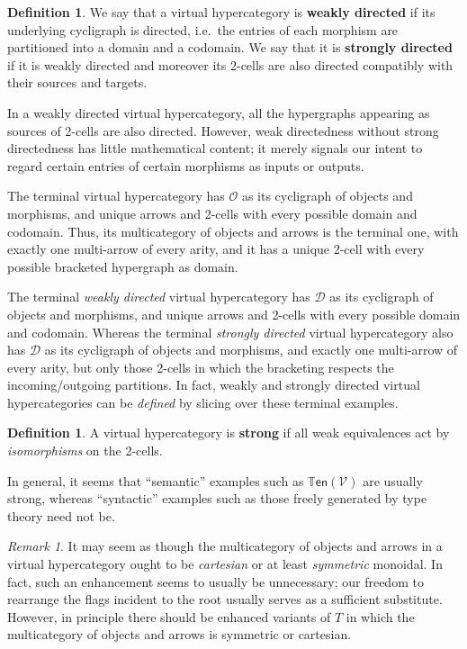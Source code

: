 \documentclass{article}
\theoremstyle{definition}
\newtheorem{defn}[thm]{Definition}
\theoremstyle{remark}
\newtheorem{rmk}[thm]{Remark}
\def\V{\mathscr{V}}
\def\ten{\mathbb{T}\mathsf{en}}
\def\thy{\mathcal{O}}
\def\dhy{\mathcal{D}}
\begin{document}
\begin{defn}\label{thm:wk-dir}
  We say that a virtual hypercategory is \textbf{weakly directed} if its underlying cycligraph is directed, i.e.\ the entries of each morphism are partitioned into a domain and a codomain.
  We say that it is \textbf{strongly directed} if it is weakly directed and moreover its 2-cells are also directed compatibly with their sources and targets.
\end{defn}

In a weakly directed virtual hypercategory, all the hypergraphs appearing as sources of 2-cells are also directed.
However, weak directedness without strong directedness has little mathematical content; it merely signals our intent to regard certain entries of certain morphisms as inputs or outputs.

The terminal virtual hypercategory has $\thy$ as its cycligraph of objects and morphisms, and unique arrows and 2-cells with every possible domain and codomain.
Thus, its multicategory of objects and arrows is the terminal one, with exactly one multi-arrow of every arity, and it has a unique 2-cell with every possible bracketed hypergraph as domain.

The terminal \emph{weakly directed} virtual hypercategory has $\dhy$ as its cycligraph of objects and morphisms, and unique arrows and 2-cells with every possible domain and codomain.
Whereas the terminal \emph{strongly directed} virtual hypercategory also has $\dhy$ as its cycligraph of objects and morphisms, and exactly one multi-arrow of every arity, but only those 2-cells in which the bracketing respects the incoming/outgoing partitions.
In fact, weakly and strongly directed virtual hypercategories can be \emph{defined} by slicing over these terminal examples.

\begin{defn}\label{thm:strong}
  A virtual hypercategory is \textbf{strong} if all weak equivalences act by \emph{isomorphisms} on the 2-cells.
\end{defn}

In general, it seems that ``semantic'' examples such as $\ten(\V)$ are usually strong, whereas ``syntactic'' examples such as those freely generated by type theory need not be.

\begin{rmk}
  It may seem as though the multicategory of objects and arrows in a virtual hypercategory ought to be \emph{cartesian} or at least \emph{symmetric} monoidal.
  In fact, such an enhancement seems to usually be unnecessary; our freedom to rearrange the flags incident to the root usually serves as a sufficient substitute.
  However, in principle there should be enhanced variants of $T$ in which the multicategory of objects and arrows is symmetric or cartesian.
\end{rmk}
\end{document}

